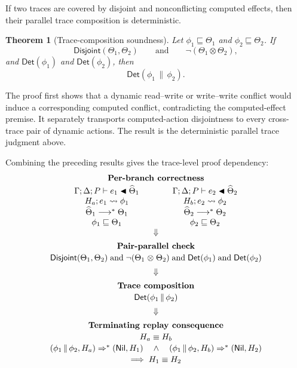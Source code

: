 \documentclass[10pt,a4paper]{article}
\newcommand{\desc}{\mathrel{\blacktriangleleft}}      %
\newcommand{\conflict}{\mathrel{\otimes}}             %
\newcommand{\approxx}{\mathrel{\sqsubseteq}}          %
\newcommand{\Nil}{\mathsf{Nil}}
\newcommand{\thetahat}{\widehat{\Theta}}
\newcommand{\Disjoint}{\mathsf{Disjoint}}
\newcommand{\DetTrace}{\mathsf{Det}}
\newtheorem{theorem}{Theorem}
\begin{document}
\noindent If two traces are covered by disjoint and
nonconflicting computed effects, then their parallel trace composition is
deterministic.

\begin{theorem}[Trace-composition soundness]
Let $\phi_1 \approxx \Theta_1$ and $\phi_2 \approxx \Theta_2$. If
\[
\Disjoint(\Theta_1,\Theta_2)
\qquad\text{and}\qquad
\neg(\Theta_1 \conflict \Theta_2),
\]
and $\DetTrace(\phi_1)$ and $\DetTrace(\phi_2)$, then
\[
\DetTrace(\phi_1 \,\|\, \phi_2).
\]
\end{theorem}

The proof first shows that a dynamic read--write or write--write
conflict would induce a corresponding computed conflict, contradicting the
computed-effect premise. It separately transports computed-action disjointness to
every cross-trace pair of dynamic actions. The result is the deterministic
parallel trace judgment above.

Combining the preceding results gives the trace-level proof dependency:
{\small
\[
\begin{array}{c}
\textbf{Per-branch correctness}
\\[.45ex]
\begin{array}{c@{\qquad\qquad}c}
\Gamma;\Delta;P\vdash e_1\desc\thetahat_1
&
\Gamma;\Delta;P\vdash e_2\desc\thetahat_2
\\
H_a;e_1\leadsto\phi_1
&
H_b;e_2\leadsto\phi_2
\\
\thetahat_1\longrightarrow^{*}\Theta_1
&
\thetahat_2\longrightarrow^{*}\Theta_2
\\
\phi_1\approxx\Theta_1
&
\phi_2\approxx\Theta_2
\end{array}
\\[1.1ex]
\Downarrow
\\[1.1ex]
\textbf{Pair-parallel check}
\\[.45ex]
\Disjoint(\Theta_1,\Theta_2)
\;\text{and}\;
\neg(\Theta_1\conflict\Theta_2)
\;\text{and}\;
\DetTrace(\phi_1)
\;\text{and}\;
\DetTrace(\phi_2)
\\[1.1ex]
\Downarrow
\\[1.1ex]
\textbf{Trace composition}
\\[.45ex]
\DetTrace(\phi_1\,\|\,\phi_2)
\\[1.1ex]
\Downarrow
\\[1.1ex]
\textbf{Terminating replay consequence}
\\[.45ex]
\begin{array}{c}
H_a\equiv H_b
\\[.35ex]
(\phi_1\,\|\,\phi_2,H_a)\Rightarrow^{*}(\Nil,H_1)
\quad\land\quad
(\phi_1\,\|\,\phi_2,H_b)\Rightarrow^{*}(\Nil,H_2)
\\[.35ex]
\Longrightarrow\; H_1\equiv H_2
\end{array}
\end{array}
\]
}
\end{document}
